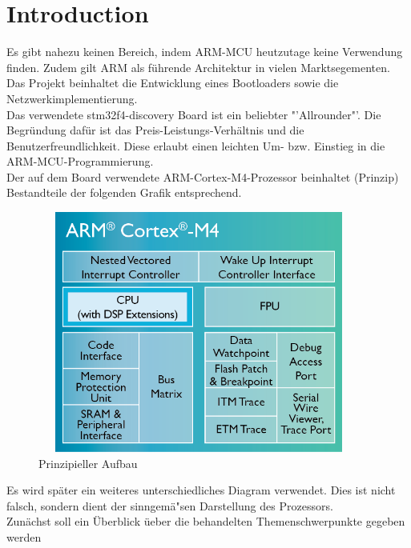 \chapter{Introduction}

Es gibt nahezu keinen Bereich, indem ARM-MCU heutzutage keine Verwendung finden. 
Zudem gilt ARM als f\"uhrende Architektur in vielen Marktsegementen.\\ 
Das Projekt beinhaltet die Entwicklung eines Bootloaders sowie die
 Netzwerkimplementierung.\\
Das verwendete stm32f4-discovery Board ist ein beliebter "'Allrounder"'.
Die Begr\"undung daf\"ur ist das Preis-Leistungs-Verh\"altnis und die
Benutzerfreundlichkeit. Diese erlaubt einen leichten Um- bzw. Einstieg in
die ARM-MCU-Programmierung.\\
Der auf dem Board verwendete ARM-Cortex-M4-Prozessor beinhaltet (Prinzip)
Bestandteile der folgenden Grafik entsprechend.\\
\begin{figure}[ht]
	\centering
	\includegraphics[width=400px, height=300px]{../img/Cortex-M4-chip-diagram-LG.png}
	\caption{Prinzipieller Aufbau}
	\label{m4_prinzip}
\end{figure}

Es wird sp\"ater ein weiteres unterschiedliches Diagram verwendet. Dies ist nicht
falsch, sondern dient der sinngem\"a"sen Darstellung des Prozessors.\\

Zun\"achst soll ein \"Uberblick \"ueber die behandelten Themenschwerpunkte gegeben
 werden

